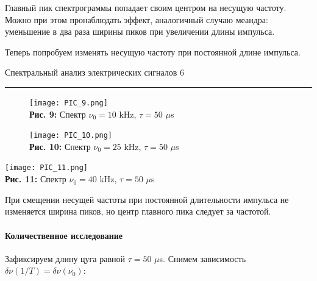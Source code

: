 \documentclass[12pt,a4paper]{scrartcl}
\begin{document}
	Главный пик спектрограммы попадает своим центром на несущую частоту. Можно при этом пронаблюдать эффект, аналогичный случаю меандра: уменьшение в два раза ширины пиков при увеличении длины импульса.
	
	Теперь попробуем изменять несущую частоту при постоянной длине импульса.
	
	
	\newpage
	
	
	\begin{flushleft}
		\footnotesize{Спектральный анализ электрических сигналов} \hspace{\fill} \footnotesize{6}
		\\[-0.3cm]\noindent\rule{\textwidth}{0.3pt}
	\end{flushleft}
	
	\begin{figure}[h]
		\begin{minipage}{0.5\linewidth}
			\begin{center}
				\texttt{[image: PIC\_9.png]}
				\\\textbf{Рис. 9:} Спектр $\nu_0 = 10$ kHz, $\tau = 50$ $\mu$s
			\end{center}
		\end{minipage}
		\begin{minipage}{0.5\linewidth}
			\begin{center}
				\texttt{[image: PIC\_10.png]}
				\\\textbf{Рис. 10:} Спектр $\nu_0 = 25$ kHz, $\tau = 50$ $\mu$s
			\end{center}
		\end{minipage}
	\end{figure}

	\begin{center}
		\texttt{[image: PIC\_11.png]}
		\\\textbf{Рис. 11:} Спектр $\nu_0 = 40$ kHz, $\tau = 50$ $\mu$s
	\end{center}
	
	При смещении несущей частоты при постоянной длительности импульса не изменяется ширина пиков, но центр главного пика следует за частотой.
	
	\paragraph{Количественное исследование} \hfill
	
	Зафиксируем длину цуга равной $\tau = 50$ $\mu$s. Снимем зависимость $\delta \nu (1/T) = \delta \nu (\nu_0)$:
	
\end{document}
